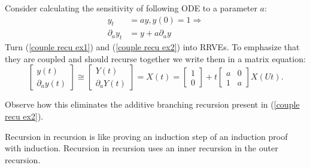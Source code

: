 \documentclass[a4paper,12pt]{article}
\begin{document}
\begin{example} \label{ex:coupled recursion}
    Consider calculating the
    sensitivity of following ODE to a
    parameter $a$:
    \begin{align}
        y_t             & =ay,y(0)=1 \Rightarrow \label{couple recu ex1} \\
        \partial_{a}y_t & = y + a \partial_{a}y \label{couple recu ex2}
    \end{align}
    Turn (\ref{couple recu ex1}) and (\ref{couple recu ex2}) into RRVEs.
    To emphasize that they are coupled and should
    recurse together we write them in a matrix equation:
    \begin{equation} \label{coupled mat}
        \begin{bmatrix}
            y(t) \\
            \partial_{a}y(t)
        \end{bmatrix} \cong
        \begin{bmatrix}
            Y(t) \\
            \partial_{a}Y(t)
        \end{bmatrix}=
        X(t)=
        \begin{bmatrix}
            1 \\
            0
        \end{bmatrix}+
        t \begin{bmatrix}
            a & 0 \\
            1 & a
        \end{bmatrix}
        X(Ut).
    \end{equation}

    Observe how this eliminates the additive branching recursion
    present in (\ref{couple recu ex2}).

\end{example}



\begin{technique}\label{tech:recu in recu}
    Recursion in recursion is like proving an induction
    step of an induction proof with induction. Recursion in recursion
    uses an inner recursion in the outer recursion.
\end{technique}
\end{document}
